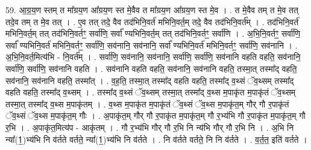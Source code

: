 \documentclass[17pt]{extarticle}
\begin{document}
59. आ॒ग्र॒य॒ण स्तम् त मा᳚ग्रय॒ण आ᳚ग्रय॒ण स्त मे॒वैव त मा᳚ग्रय॒ण आ᳚ग्रय॒ण स्त मे॒व । . त मे॒वैव तम् त मे॒व तत् तदे॒व तम् त मे॒व तत् । . ए॒व तत् तदे॒ वैव तद॑भिनि॒वर्त॑ मभिनि॒वर्त॒म् तदे॒ वैव तद॑भिनि॒वर्त᳚म् । . तद॑भिनि॒वर्त॑ मभिनि॒वर्त॒म् तत् तद॑भिनि॒वर्तꣳ॒॒ सर्वा॑णि॒ सर्वा᳚ ण्यभिनि॒वर्त॒म् तत् तद॑भिनि॒वर्तꣳ॒॒ सर्वा॑णि । . अ॒भि॒नि॒वर्तꣳ॒॒ सर्वा॑णि॒ सर्वा᳚ ण्यभिनि॒वर्त॑ मभिनि॒वर्तꣳ॒॒ सर्वा॑णि॒ सव॑नानि॒ सव॑नानि॒ सर्वा᳚
ण्यभिनि॒वर्त॑ मभिनि॒वर्तꣳ॒॒ सर्वा॑णि॒ सव॑नानि । . अ॒भि॒नि॒वर्त॒मित्य॑भि - नि॒वर्त᳚म् । . सर्वा॑णि॒ सव॑नानि॒ सव॑नानि॒ सर्वा॑णि॒ सर्वा॑णि॒ सव॑नानि वहति वहति॒ सव॑नानि॒ सर्वा॑णि॒ सर्वा॑णि॒ सव॑नानि वहति । . सव॑नानि वहति वहति॒ सव॑नानि॒ सव॑नानि वहति॒ तस्मा॒त् तस्मा᳚द् वहति॒ सव॑नानि॒ सव॑नानि वहति॒ तस्मा᳚त् । . व॒ह॒ति॒ तस्मा॒त् तस्मा᳚द् वहति वहति॒ तस्मा᳚द् व॒थ्सं ॅव॒थ्सम् तस्मा᳚द् वहति वहति॒ तस्मा᳚द् व॒थ्सम् । . तस्मा᳚द् व॒थ्सं ॅव॒थ्सम् तस्मा॒त् तस्मा᳚द् व॒थ्स म॒पाकृ॑त म॒पाकृ॑तं ॅव॒थ्सम् तस्मा॒त् तस्मा᳚द् व॒थ्स म॒पाकृ॑तम् । . व॒थ्स म॒पाकृ॑त म॒पाकृ॑तं ॅव॒थ्सं ॅव॒थ्स म॒पाकृ॑त॒म् गौर् गौ र॒पाकृ॑तं ॅव॒थ्सं ॅव॒थ्स म॒पाकृ॑त॒म् गौः । . अ॒पाकृ॑त॒म् गौर् गौ र॒पाकृ॑त म॒पाकृ॑त॒म् गौ र॒भ्य॑भि गौ र॒पाकृ॑त म॒पाकृ॑त॒म् गौ र॒भि । . अ॒पाकृ॑त॒मित्य॑प - आकृ॑तम् । . गौ र॒भ्य॑भि गौर् गौ र॒भि नि न्य॑भि गौर् गौ र॒भि नि । . अ॒भि नि न्या᳚(1॒)भ्य॑भि नि व॑र्तते वर्तते॒ न्या᳚(1॒)भ्य॑भि नि व॑र्तते । . नि व॑र्तते वर्तते॒ नि नि व॑र्तते । . व॒र्त॒त॒ इति॑ वर्तते । \newline
\pagebreak
\end{document}
